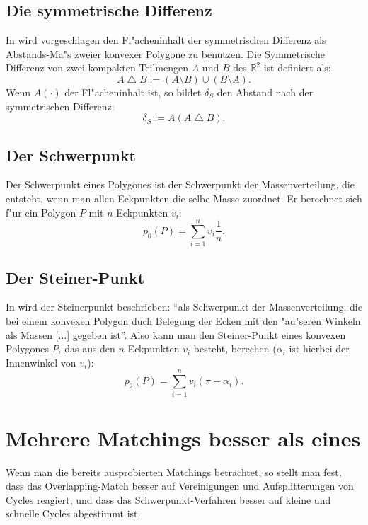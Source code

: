 \documentclass[a4paper,11pt]{scrreprt}
\begin{document}
\subsection{Die symmetrische Differenz}

In \cite{AFRW} wird vorgeschlagen den Fl"acheninhalt der symmetrischen Differenz als Abstands-Ma"s zweier konvexer Polygone zu benutzen. Die Symmetrische Differenz von zwei kompakten Teilmengen $A$ und $B$ des $\mathbb{R}^2 $ ist definiert als:
$$A\bigtriangleup B:=(A\setminus B)\cup(B\setminus A).$$
Wenn $A(\cdot)$ der Fl"acheninhalt ist, so bildet $\delta_S$ den Abstand nach der symmetrischen Differenz:
$$\delta_S:=A(A \bigtriangleup B).$$

\subsection{Der Schwerpunkt}

Der Schwerpunkt eines Polygones ist der Schwerpunkt der Massenverteilung, die entsteht, wenn man allen Eckpunkten die selbe Masse zuordnet. Er berechnet sich f"ur ein Polygon $P$ mit $n$ Eckpunkten $v_i$:
$$p_0(P)=\sum^n_{i=1}v_i \frac{1}{n}.$$

\subsection{Der Steiner-Punkt}

In \cite{Sch} wird der Steinerpunkt beschrieben: "`als Schwerpunkt der Massenverteilung, die bei einem konvexen Polygon duch Belegung der Ecken mit den "au"seren Winkeln als Massen [...] gegeben ist"'. Also kann man den Steiner-Punkt eines konvexen Polygones $P$, das aus den $n$ Eckpunkten $v_i$ besteht, berechen ($\alpha_i$ ist hierbei der Innenwinkel von $v_i$):
$$p_2(P)=\sum^n_{i=1}v_i (\pi-\alpha_i).$$

\section{Mehrere Matchings besser als eines}

Wenn man die bereits ausprobierten Matchings betrachtet, so stellt man fest, dass das Overlapping-Match besser auf Vereinigungen und Aufsplitterungen von Cycles reagiert, und dass das Schwerpunkt-Verfahren besser auf kleine und schnelle Cycles abgestimmt ist. 
\end{document}
